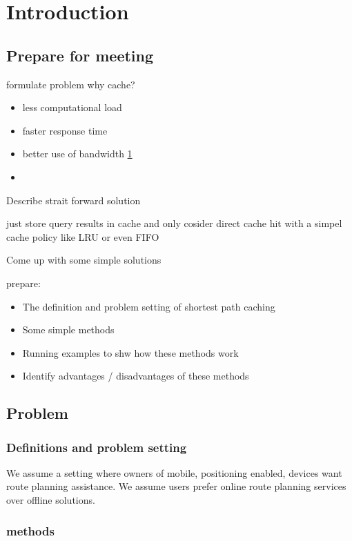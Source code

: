 \section{Introduction} \label{sec:intro}

\subsection{Prepare for meeting}
formulate problem
 why cache?
\begin{itemize}
\item less computational load
\item faster response time
\item better use of bandwidth \ref{sec:intro}
\item
\end{itemize}

Describe strait forward solution

just store query results in cache and only cosider direct cache hit with a
simpel cache policy like LRU or even FIFO


Come up with some simple solutions

prepare:
\begin{itemize}
\item The definition and problem setting of shortest path caching
\item Some simple methods
\item Running examples to shw how these methods work
\item Identify advantages / disadvantages of these methods
\end{itemize}


\subsection{Problem}

\subsubsection{Definitions and problem setting}
We assume a setting where owners of mobile, positioning enabled, devices want route planning assistance. We assume users prefer online route planning services over offline solutions. 



\subsubsection{methods}


